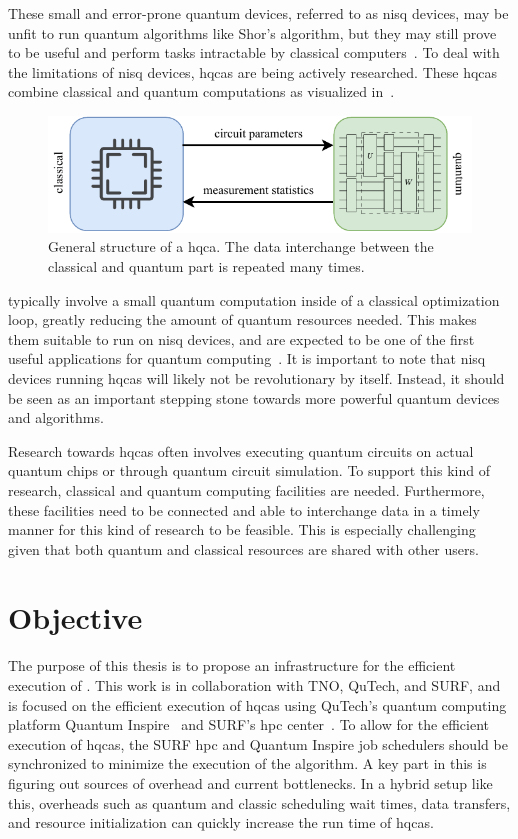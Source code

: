 These small and error-prone quantum devices, referred to as \gls{nisq} devices, may be unfit to run quantum algorithms like Shor's algorithm, but they may still prove to be useful and perform tasks intractable by classical computers~\cite{preskill2018quantum}.
To deal with the limitations of \gls{nisq} devices, \glspl{hqca} are being actively researched.
These \glspl{hqca} combine classical and quantum computations as visualized in~.
\begin{figure}[ht]
    \centering
    \includegraphics[width=0.7\linewidth]{figures/hybrid-quantum-algorithm.pdf}
    \caption[General structure of a \acrshort{hqca}.]{
        General structure of a \gls{hqca}.
        The data interchange between the classical and quantum part is repeated many times.
    }
    \label{fig:hybrid-quantum-classical}
\end{figure}
 typically involve a small quantum computation inside of a classical optimization loop, greatly reducing the amount of quantum resources needed.
This makes them suitable to run on \gls{nisq} devices, and are expected to be one of the first useful applications for quantum computing~\cite{endo2021hybrid}.
It is important to note that \gls{nisq} devices running \glspl{hqca} will likely not be revolutionary by itself.
Instead, it should be seen as an important stepping stone towards more powerful quantum devices and algorithms.

Research towards \glspl{hqca} often involves executing quantum circuits on actual quantum chips or through quantum circuit simulation.
To support this kind of research, classical and quantum computing facilities are needed.
Furthermore, these facilities need to be connected and able to interchange data in a timely manner for this kind of research to be feasible.
This is especially challenging given that both quantum and classical resources are shared with other users.

\section{Objective}
The purpose of this thesis is to propose an infrastructure for the efficient execution of .
This work is in collaboration with TNO, QuTech, and SURF, and is focused on the efficient execution of \glspl{hqca} using QuTech's quantum computing platform Quantum Inspire~\cite{quantuminspire} and SURF's \gls{hpc} center~\cite{surf}.
To allow for the efficient execution of \glspl{hqca}, the SURF \gls{hpc} and Quantum Inspire job schedulers should be synchronized to minimize the execution of the algorithm.
A key part in this is figuring out sources of overhead and current bottlenecks.
In a hybrid setup like this, overheads such as quantum and classic scheduling wait times, data transfers, and resource initialization can quickly increase the run time of \glspl{hqca}.

